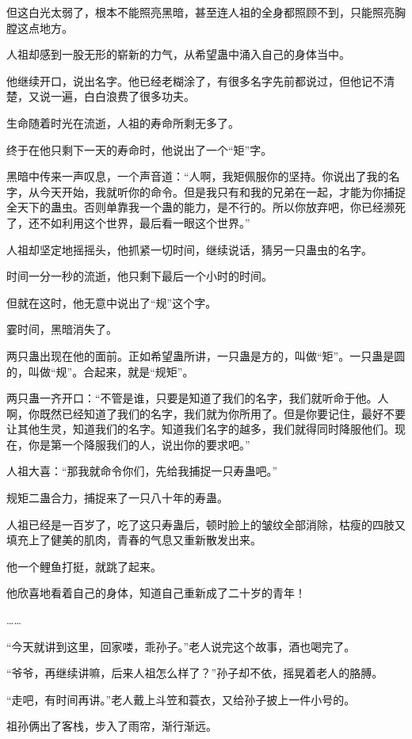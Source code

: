 \begin{this_body}
但这白光太弱了，根本不能照亮黑暗，甚至连人祖的全身都照顾不到，只能照亮胸膛这点地方。

人祖却感到一股无形的崭新的力气，从希望蛊中涌入自己的身体当中。

他继续开口，说出名字。他已经老糊涂了，有很多名字先前都说过，但他记不清楚，又说一遍，白白浪费了很多功夫。

生命随着时光在流逝，人祖的寿命所剩无多了。

终于在他只剩下一天的寿命时，他说出了一个“矩”字。

黑暗中传来一声叹息，一个声音道：“人啊，我矩佩服你的坚持。你说出了我的名字，从今天开始，我就听你的命令。但是我只有和我的兄弟在一起，才能为你捕捉全天下的蛊虫。否则单靠我一个蛊的能力，是不行的。所以你放弃吧，你已经濒死了，还不如利用这个世界，最后看一眼这个世界。”

人祖却坚定地摇摇头，他抓紧一切时间，继续说话，猜另一只蛊虫的名字。

时间一分一秒的流逝，他只剩下最后一个小时的时间。

但就在这时，他无意中说出了“规”这个字。

霎时间，黑暗消失了。

两只蛊出现在他的面前。正如希望蛊所讲，一只蛊是方的，叫做“矩”。一只蛊是圆的，叫做“规”。合起来，就是“规矩”。

两只蛊一齐开口：“不管是谁，只要是知道了我们的名字，我们就听命于他。人啊，你既然已经知道了我们的名字，我们就为你所用了。但是你要记住，最好不要让其他生灵，知道我们的名字。知道我们名字的越多，我们就得同时降服他们。现在，你是第一个降服我们的人，说出你的要求吧。”

人祖大喜：“那我就命令你们，先给我捕捉一只寿蛊吧。”

规矩二蛊合力，捕捉来了一只八十年的寿蛊。

人祖已经是一百岁了，吃了这只寿蛊后，顿时脸上的皱纹全部消除，枯瘦的四肢又填充上了健美的肌肉，青春的气息又重新散发出来。

他一个鲤鱼打挺，就跳了起来。

他欣喜地看着自己的身体，知道自己重新成了二十岁的青年！

……

“今天就讲到这里，回家喽，乖孙子。”老人说完这个故事，酒也喝完了。

“爷爷，再继续讲嘛，后来人祖怎么样了？”孙子却不依，摇晃着老人的胳膊。

“走吧，有时间再讲。”老人戴上斗笠和蓑衣，又给孙子披上一件小号的。

祖孙俩出了客栈，步入了雨帘，渐行渐远。


\end{this_body}
